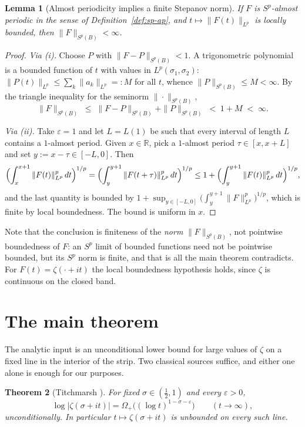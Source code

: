 \documentclass[11pt]{amsart}
\newtheorem{theorem}{Theorem}[section]
\newtheorem{lemma}[theorem]{Lemma}
\theoremstyle{definition}
\theoremstyle{remark}
\newcommand{\bbR}{\mathbb{R}}
\begin{document}
\begin{lemma}[Almost periodicity implies a finite Stepanov norm]
\label{lem:bounded}
If $F$ is $S^p$-almost periodic in the sense of
Definition~\ref{def:sp-ap}, and $t\mapsto\|F(t)\|_{L^p}$ is locally
bounded, then $\|F\|_{S^p(B)}<\infty$.
\end{lemma}

\begin{proof}
\emph{Via (i).} Choose $P$ with $\|F-P\|_{S^p(B)}<1$. A trigonometric
polynomial is a bounded function of $t$ with values in
$L^p(\sigma_1,\sigma_2)$: $\|P(t)\|_{L^p}\leq\sum_k\|a_k\|_{L^p}=:M$
for all $t$, whence $\|P\|_{S^p(B)}\leq M<\infty$. By the triangle
inequality for the seminorm $\|\cdot\|_{S^p(B)}$,
\[
\|F\|_{S^p(B)}\;\leq\;\|F-P\|_{S^p(B)}+\|P\|_{S^p(B)}\;<\;1+M\;<\;\infty .
\]

\emph{Via (ii).} Take $\varepsilon=1$ and let $L=L(1)$ be such that
every interval of length $L$ contains a $1$-almost period. Given
$x\in\bbR$, pick a $1$-almost period $\tau\in[x,x+L]$ and set
$y:=x-\tau\in[-L,0]$. Then
\[
\Bigl(\int_x^{x+1}\|F(t)\|_{L^p}^p\,dt\Bigr)^{1/p}
=\Bigl(\int_y^{y+1}\|F(t+\tau)\|_{L^p}^p\,dt\Bigr)^{1/p}
\leq 1+\Bigl(\int_y^{y+1}\|F(t)\|_{L^p}^p\,dt\Bigr)^{1/p},
\]
and the last quantity is bounded by
$1+\sup_{y\in[-L,0]}\bigl(\int_y^{y+1}\|F\|_{L^p}^p\bigr)^{1/p}$,
which is finite by local boundedness. The bound is uniform in $x$.
\end{proof}

Note that the conclusion is finiteness of the \emph{norm}
$\|F\|_{S^p(B)}$, not pointwise boundedness of $F$: an $S^p$ limit of
bounded functions need not be pointwise bounded, but its $S^p$ norm is
finite, and that is all the main theorem contradicts. For
$F(t)=\zeta(\cdot+it)$ the local boundedness hypothesis holds, since
$\zeta$ is continuous on the closed band.

\section{The main theorem}\label{sec:main}

The analytic input is an unconditional lower bound for large values of
$\zeta$ on a fixed line in the interior of the strip. Two classical
sources suffice, and either one alone is enough for our purposes.

\begin{theorem}[Titchmarsh {\cite[Thm.~8.12]{Titchmarsh}}]
\label{thm:titchmarsh}
For fixed $\sigma\in(\tfrac12,1)$ and every $\varepsilon>0$,
\[
\log|\zeta(\sigma+it)|=\Omega_+\bigl((\log t)^{1-\sigma-\varepsilon}\bigr)
\qquad(t\to\infty),
\]
unconditionally. In particular $t\mapsto\zeta(\sigma+it)$ is unbounded
on every such line.
\end{theorem}
\end{document}
